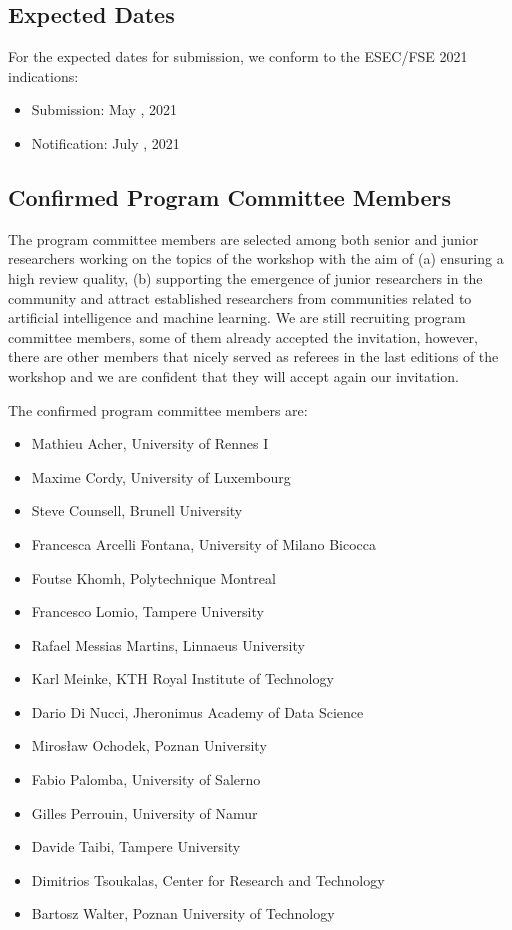 \subsection{Expected Dates}

For the expected dates for submission, we conform to the ESEC/FSE 2021 indications:
\begin{itemize}[topsep=0.5em, itemsep=0.5em]
	\item Submission: May , 2021
	\item Notification: July , 2021
\end{itemize}


\subsection{Confirmed Program Committee Members}
The program committee members are selected among both senior and junior researchers working on the topics of the workshop with the aim of (a) ensuring a high review quality, (b) supporting the emergence of junior researchers in the community and attract established researchers from communities related to artificial intelligence and machine learning.
We are still recruiting program committee members, some of them already accepted the invitation, however, there are other members that nicely served as referees in the last editions of the workshop and we are confident that they will accept again our invitation.

\medskip
\noindent The confirmed program committee members are:
\begin{itemize}[topsep=0.5em, itemsep=0.5em]
  \item Mathieu Acher, University of Rennes I
  \item Maxime Cordy, University of Luxembourg
  \item Steve Counsell, Brunell University
  \item Francesca Arcelli Fontana, University of Milano Bicocca
  \item Foutse Khomh, Polytechnique Montreal
  \item Francesco Lomio, Tampere University
  \item Rafael Messias Martins, Linnaeus University
  \item Karl Meinke, KTH Royal Institute of Technology
  \item Dario Di Nucci, Jheronimus Academy of Data Science
  \item Mirosław Ochodek, Poznan University
  \item Fabio Palomba, University of Salerno
  \item Gilles Perrouin, University of Namur
  \item Davide Taibi, Tampere University
  \item Dimitrios Tsoukalas, Center for Research and Technology
  \item Bartosz Walter, Poznan University of Technology
\end{itemize}

